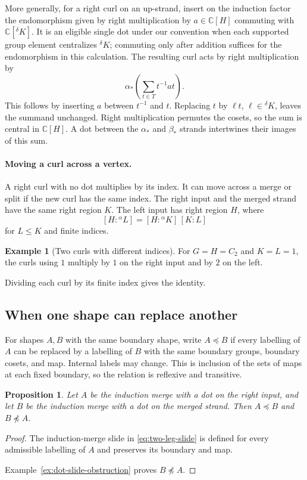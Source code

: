 \documentclass[11pt,a4paper]{article}
\numberwithin{equation}{section}
\newtheorem{proposition}[theorem]{Proposition}
\theoremstyle{definition}
\newtheorem{example}{Example}[section]
\newcommand{\C}{\mathbb C}
\newcommand{\cg}[2]{{}^{#1}\!#2}
\begin{document}
More generally, for a right curl on an up-strand, insert on the induction
factor the endomorphism given by right multiplication by
\(a\in\C[H]\) commuting with \(\C[\cg{\delta}{K}]\).
It is an eligible single dot under our convention when each supported
group element centralizes \(\cg{\delta}{K}\); commuting only after
addition suffices for the endomorphism in this calculation.
The resulting curl acts by right multiplication by
\[
 \alpha_*\!\left(\sum_{t\in T}t^{-1}at\right).
\]
This follows by inserting \(a\) between \(t^{-1}\) and \(t\).
Replacing \(t\) by \(\ell t\), \(\ell\in\cg{\delta}{K}\), leaves
the summand unchanged. Right multiplication permutes the cosets,
so the sum is central in \(\C[H]\). A dot between the \(\alpha_*\)
and \(\beta_*\) strands intertwines their images of this sum.

\paragraph{Moving a curl across a vertex.}
A right curl with no dot multiplies by its index. It can move
across a merge or split if the new curl has the same index.
The right input and the merged strand have the same right
region \(K\). The left input has right region \(H\), where
\[
 [H:\cg{\alpha}{L}]=[H:\cg{\alpha}{K}]\,[K:L]
\]
for \(L\le K\) and finite indices.

\begin{example}[Two curls with different indices]\label{ex:different-curl-indices}
For \(G=H=C_2\) and \(K=L=1\),
the curls using \(1\) multiply by \(1\) on the right input and
by \(2\) on the left.
\end{example}

Dividing each curl by its finite index
gives the identity.

\subsection{When one shape can replace another}

For shapes \(A,B\) with the same boundary shape, write \(A\preceq B\)
if every labelling of \(A\) can be replaced by a labelling of \(B\)
with the same boundary groups, boundary cosets, and map. Internal
labels may change. This is inclusion of the sets of maps at each
fixed boundary, so the relation is reflexive and transitive.

\begin{proposition}\label{prop:preorder-not-symmetric}
Let \(A\) be the induction merge with a dot on the right input, and
let \(B\) be the induction merge with a dot on the merged strand. Then
\(A\preceq B\) and \(B\npreceq A\).
\end{proposition}
\begin{proof}
The induction-merge slide in \eqref{eq:two-leg-slide} is defined for
every admissible labelling of \(A\) and preserves its boundary and map.


Example~\ref{ex:dot-slide-obstruction} proves \(B\npreceq A\).
\end{proof}
\end{document}
